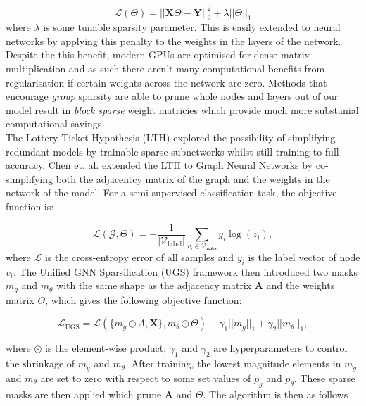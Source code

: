 \documentclass[honours,12pt]{unswthesis}
\numberwithin{equation}{section}
\begin{document}
\begin{equation}
    \mathcal{L}(\Theta) = ||\textbf{X}\Theta - \textbf{Y}||^2_2 + \lambda||\Theta||_1
\end{equation}
where $\lambda$ is some tunable sparsity parameter. This is easily extended to neural networks by applying this penalty to the weights in the layers of the network.\cite{ma2019transformed}
Despite the this benefit, modern GPUs are optimised for dense matrix multiplication and as such there aren't many computational benefits from regularisation if certain weights across the network are zero.
Methods that encourage \textit{group} sparsity are able to prune whole nodes and layers out of our model result in \textit{block sparse} weight matricies which provide much more substanial computational savings.
\cite{scardapane2017group}\cite{wen2016learning}\cite{molchanov2017variational}\cite{louizos2017bayesian} \\

{\noindent}The Lottery Ticket Hypothesis (LTH)\cite{frankle2020linear} explored the possibility of simplifying redundant models by trainable sparse subnetworks whilst
still training to full accuracy. Chen et. al.\cite{chen2021unified} extended the LTH to Graph Neural Networks by co-simplifying both the adjacentcy matrix of the graph and the weights in 
the network of the model. For a semi-supervised classification task, the objective function is:

\begin{equation}
    \mathcal{L}(\mathcal{G}, \Theta) = -\frac{1}{|\mathcal{V}_{\text{label}}|}\sum_{v_i \in \mathcal{V_{\text{label}}}} y_i \log{(z_i)},
\end{equation}
where $\mathcal{L}$ is the cross-entropy error of all samples and $y_i$ is the label vector of node $v_i$. The Unified GNN Sparsification (UGS)
framework then introduced two masks $m_g$ and $m_\theta$ with the same shape as the adjacency matrix $\textbf{A}$ and the weights matrix $\Theta$, which
gives the following objective function:

\begin{equation}\label{eqn:l_ugs}
    \mathcal{L}_{\text{UGS}} = \mathcal{L}(\{m_g \odot A, \textbf{X}\}, m_\theta \odot \Theta) + \gamma_1 ||m_g||_1 + \gamma_2 ||m_\theta||_1,
\end{equation}

\noindent where $\odot$ is the element-wise product, $\gamma_1$ and $\gamma_2$ are hyperparameters to control the shrinkage of $m_g$ and $m_\theta$.
After training, the lowest magnitude elements in $m_g$ and $m_\theta$ are set to zero with respect to some set values of $p_g$ and $p_\theta$.
These sparse masks are then applied which prune $\textbf{A}$ and $\Theta$. The algorithm is then as follows
\end{document}
